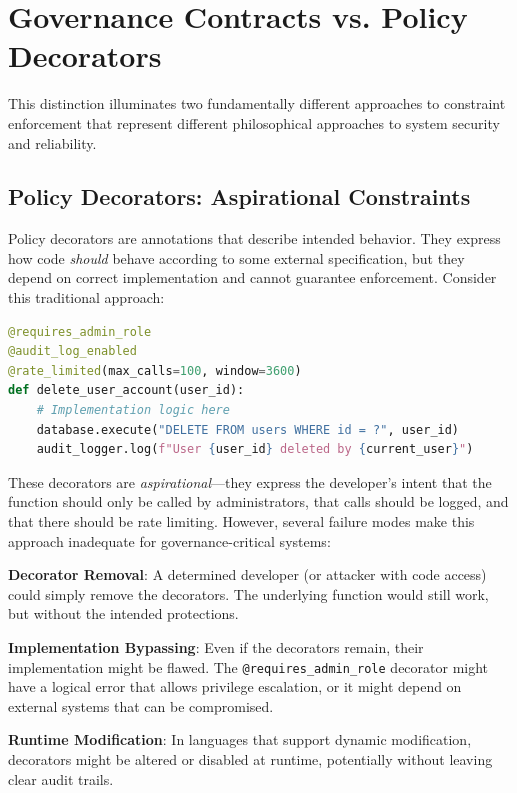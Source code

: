 \section{Governance Contracts vs. Policy Decorators}

This distinction illuminates two fundamentally different approaches to constraint enforcement that represent different philosophical approaches to system security and reliability.

\subsection{Policy Decorators: Aspirational Constraints}

Policy decorators are annotations that describe intended behavior. They express how code \textit{should} behave according to some external specification, but they depend on correct implementation and cannot guarantee enforcement. Consider this traditional approach:

\begin{lstlisting}[language=Python, caption=Traditional Policy Decorator Approach]
@requires_admin_role
@audit_log_enabled
@rate_limited(max_calls=100, window=3600)
def delete_user_account(user_id):
    # Implementation logic here
    database.execute("DELETE FROM users WHERE id = ?", user_id)
    audit_logger.log(f"User {user_id} deleted by {current_user}")
\end{lstlisting}

These decorators are \textit{aspirational}—they express the developer's intent that the function should only be called by administrators, that calls should be logged, and that there should be rate limiting. However, several failure modes make this approach inadequate for governance-critical systems:

\textbf{Decorator Removal}: A determined developer (or attacker with code access) could simply remove the decorators. The underlying function would still work, but without the intended protections.

\textbf{Implementation Bypassing}: Even if the decorators remain, their implementation might be flawed. The \texttt{@requires\_admin\_role} decorator might have a logical error that allows privilege escalation, or it might depend on external systems that can be compromised.

\textbf{Runtime Modification}: In languages that support dynamic modification, decorators might be altered or disabled at runtime, potentially without leaving clear audit trails.

